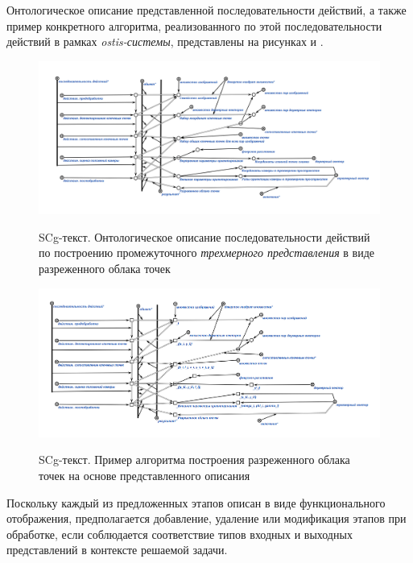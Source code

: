 Онтологическое описание представленной последовательности действий, а также пример конкретного алгоритма, реализованного по этой последовательности действий в рамках \textit{ostis-системы}, представлены на рисунках \textit{} и \textit{}.

\begin{figure}[H]
    \caption{SCg-текст. Онтологическое описание последовательности действий по построению промежуточного \textit{трехмерного представления} в виде разреженного облака точек}
    \includegraphics[scale=0.8, width=1.0\textwidth]{author/part4/figures/reconstruction.png}
    \label{fig:reconstruction}
\end{figure}

\begin{figure}[H]
    \caption{SCg-текст. Пример алгоритма построения разреженного облака точек на основе представленного описания}
    \includegraphics[scale=0.8, width=1.0\textwidth]{author/part4/figures/reconstruction-example.png}
    \label{fig:reconstruction-example}
\end{figure}

Поскольку каждый из предложенных этапов описан в виде функционального отображения, предполагается добавление, удаление или модификация этапов при обработке, если соблюдается соответствие типов входных и выходных представлений в контексте решаемой задачи.

